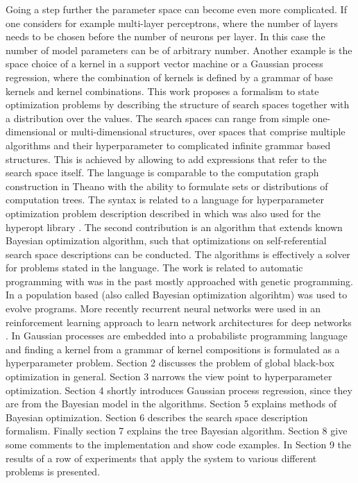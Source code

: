 \documentclass[english]{article}
\begin{document}
Going a step further the parameter space can become even more complicated. If one considers for example multi-layer perceptrons, where the number of layers needs to be chosen before the number of neurons per layer. In this case the number of model parameters can be of arbitrary number. Another example is the space choice of a kernel in a support vector machine or a Gaussian process regression, where the combination of kernels is defined by a grammar of base kernels and kernel combinations.
This work proposes a formalism to state optimization problems by describing the structure of search spaces together with a distribution over the values. The search spaces can range from simple one-dimensional or multi-dimensional structures, over spaces that comprise multiple algorithms and their hyperparameter to complicated infinite grammar based structures. This is achieved by allowing to add expressions that refer to the search space itself. The language is comparable to the computation graph construction in Theano with the ability to formulate sets or distributions of computation trees. The syntax is related to a language for hyperparameter optimization problem description described in \cite{bergstra_making_2013} which was also used for the hyperopt library \cite{bergstra_hyperopt:_2013}. The second contribution is an algorithm that extends known Bayesian optimization algorithm, such that optimizations on self-referential search space descriptions can be conducted. The algorithms is effectively a solver for problems stated in the language.
The work is related to automatic programming with was in the past mostly approached with genetic programming. In \cite{goertzel_learning_2005} a population based (also called Bayesian optimization algorihtm) was used to evolve programs. More recently recurrent neural networks were used in an reinforcement learning approach to learn network architectures for deep networks \cite{zoph_neural_2016}. In \cite{schaechtle_probabilistic_2015} Gaussian processes are embedded into a probabilistc programming language and finding a kernel from a grammar of kernel compositions is formulated as a hyperparameter problem.
Section 2 discusses the problem of global black-box optimization in general. Section 3 narrows the view point to hyperparameter optimization.
Section 4 shortly introduces Gaussian process regression, since they are from the Bayesian model in the algorithms.
Section 5 explains methods of Bayesian optimization.
Section 6 describes the search space description formalism.
Finally section 7 explains the tree Bayesian algorithm.
Section 8 give some comments to the implementation and show code examples.
In Section 9 the results of a row of experiments that apply the system to various different problems is presented.
\end{document}
